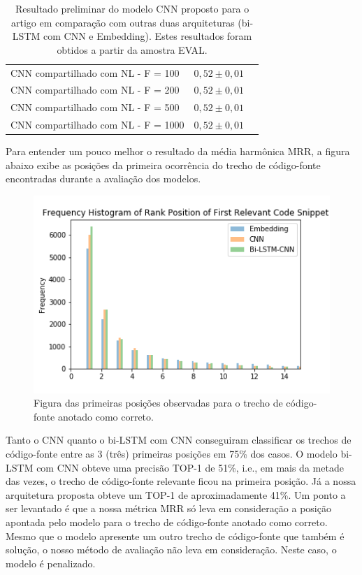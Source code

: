 \begin{table}[h]
\begin{tabular}{ p{10cm} P{3cm} P{3cm} }
 CNN compartilhado com NL - F = 100 & $0,52 \pm 0,01$\\
 
 CNN compartilhado com NL - F = 200 & $0,52 \pm 0,01$\\
 
 CNN compartilhado com NL - F = 500 & $0,52 \pm 0,01$\\
 
 CNN compartilhado com NL - F = 1000 & $0,52 \pm 0,01$\\
 
 \hline
\end{tabular}
\caption{Resultado preliminar do modelo CNN proposto para o artigo \cite{marcelo-vem-2019} em comparação com outras duas arquiteturas (bi-LSTM com CNN e Embedding). Estes resultados foram obtidos a partir da amostra EVAL.}
\label{table:resultados-preliminares}
\end{table}

Para entender um pouco melhor o resultado da média harmônica MRR, a figura abaixo exibe as posições da primeira ocorrência do trecho de código-fonte encontradas durante a avaliação dos modelos.

\begin{figure}[h]
    \centering
    \includegraphics[width=1\textwidth]{figuras/cap-resultados-preliminares/histogram_results.png}
    \caption{Figura das primeiras posições observadas para o trecho de código-fonte anotado como correto.}
    \label{fig:histogram-mrr}
\end{figure}


Tanto o CNN quanto o bi-LSTM com CNN conseguiram classificar os trechos de código-fonte entre as 3 (três) primeiras posições em 75\% dos casos. O modelo bi-LSTM com CNN obteve uma precisão TOP-1 de 51\%, i.e., em mais da metade das vezes, o trecho de código-fonte relevante ficou na primeira posição. Já a nossa arquitetura proposta obteve um TOP-1 de aproximadamente 41\%. Um ponto a ser levantado é que a nossa métrica MRR só leva em consideração a posição apontada pelo modelo para o trecho de código-fonte anotado como correto. Mesmo que o modelo apresente um outro trecho de código-fonte que também é solução, o nosso método de avaliação não leva em consideração. Neste caso, o modelo é penalizado.

